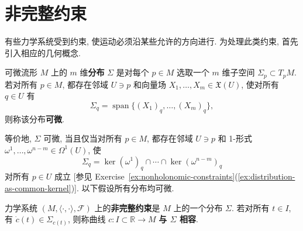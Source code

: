 \section{非完整约束}\label{sec:nonholonomic-constraints}

有些力学系统受到约束, 使运动必须沿某些允许的方向进行. 为处理此类约束, 首先引入相应的几何概念.

\begin{RiemannDefinition}\label{def:differentiable-distribution}
可微流形 $M$ 上的 $m$ 维\textbf{分布} $\Sigma$ 是对每个 $p\in M$ 选取一个 $m$ 维子空间 $\Sigma_p\subset T_pM$. 若对所有 $p\in M$, 都存在邻域 $U\ni p$ 和向量场 $X_1,\ldots,X_m\in\mathfrak{X}(U)$, 使对所有 $q\in U$ 有
\[
  \Sigma_q=\operatorname{span}\bigl\{(X_1)_q,\ldots,(X_m)_q\bigr\},
\]
则称该分布\textbf{可微}.
\end{RiemannDefinition}

等价地, $\Sigma$ 可微, 当且仅当对所有 $p\in M$, 都存在邻域 $U\ni p$ 和 1-形式 $\omega^1,\ldots,\omega^{n-m}\in\Omega^1(U)$, 使
\[
  \Sigma_q=\ker(\omega^1)_q\cap\cdots\cap\ker(\omega^{n-m})_q
\]
对所有 $p\in U$ 成立 [参见 Exercise~\ref{ex:nonholonomic-constraints}(\ref{ex:distribution-as-common-kernel})]. 以下假设所有分布均可微.

\begin{RiemannDefinition}\label{def:nonholonomic-constraint}
力学系统 $(M,\langle\cdot,\cdot\rangle,\mathcal{F})$ 上的\textbf{非完整约束}是 $M$ 上的一个分布 $\Sigma$. 若对所有 $t\in I$, 有 $\dot c(t)\in\Sigma_{c(t)}$, 则称曲线 $c:I\subset\mathbb{R}\to M$ \textbf{与 $\Sigma$ 相容}.
\end{RiemannDefinition}

